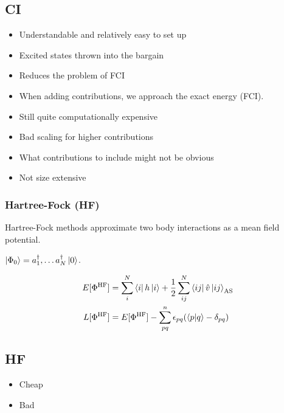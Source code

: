 \documentclass[
11pt,notheorems,hyperref={pdfauthor=whatever}
]{beamer}
\begin{document}
\subsection{CI}
\begin{frame}
    \textcolor{Green}{}
    \begin{itemize}
        \item Understandable and relatively easy to set up 
        \item Excited states thrown into the bargain
        \item Reduces the problem of FCI
        \item When adding contributions, we approach the exact energy (FCI).
    \end{itemize}
    \vspace{20px}
    \textcolor{Red}{}
    \begin{itemize}
        \item Still quite computationally expensive
        \item Bad scaling for higher contributions
        \item What contributions to include might not be obvious
        \item Not size extensive 
    \end{itemize}
\end{frame}

\begin{frame}
    \frametitle{Hartree-Fock (HF)}
    Hartree-Fock methods approximate two body interactions as a mean field potential. 

    $\ket{\Phi_0} = a_{1}^{\dagger},\ldots a_{N}^{\dagger} \ket{0}$.

    \begin{align*}
        E[\Phi^{\text{HF}}] &= \sum_{i}^{N} \bra{i}h\ket{i} + \frac{1}{2}\sum_{ij}^{N} \bra{ij}\hat{v}\ket{ij}_{\text{AS}} \\
        L[\Phi^{\text{HF}}] &= E[\Phi^{\text{HF}}] - \sum_{pq}^{n} \epsilon_{pq}(\braket{p|q} - \delta_{pq})
    \end{align*}
\end{frame}

\subsection{HF}
\begin{frame}
    \textcolor{Green}{}
    \begin{itemize}
        \item Cheap 
    \end{itemize}
    \vspace{20px}
    \textcolor{Red}{}
    \begin{itemize}
        \item Bad
    \end{itemize}
\end{frame}
\end{document}
